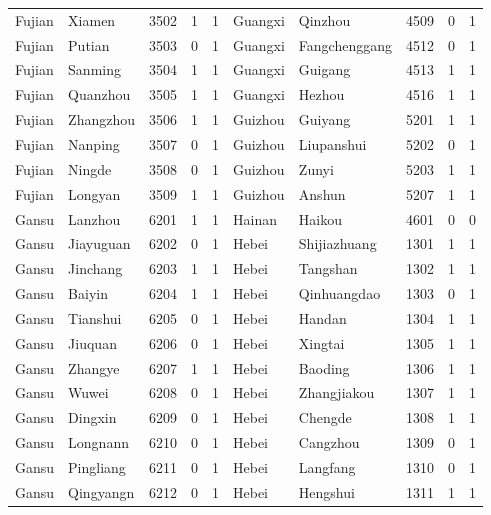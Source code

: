 \documentclass[12pt]{article}
\begin{document}
\begin{table}[!htb]
\begin{adjustbox}{width=\textwidth, totalheight=\baselineskip,keepaspectratio}
\begin{tabular}{llllllllll}
Fujian    & Xiamen    & 3502 & 1   & 1   & Guangxi      & Qinzhou       & 4509 & 0   & 1   \\
Fujian    & Putian    & 3503 & 0   & 1   & Guangxi      & Fangchenggang & 4512 & 0   & 1   \\
Fujian    & Sanming   & 3504 & 1   & 1   & Guangxi      & Guigang       & 4513 & 1   & 1   \\
Fujian    & Quanzhou  & 3505 & 1   & 1   & Guangxi      & Hezhou        & 4516 & 1   & 1   \\
Fujian    & Zhangzhou & 3506 & 1   & 1   & Guizhou      & Guiyang       & 5201 & 1   & 1   \\
Fujian    & Nanping   & 3507 & 0   & 1   & Guizhou      & Liupanshui    & 5202 & 0   & 1   \\
Fujian    & Ningde    & 3508 & 0   & 1   & Guizhou      & Zunyi         & 5203 & 1   & 1   \\
Fujian    & Longyan   & 3509 & 1   & 1   & Guizhou      & Anshun        & 5207 & 1   & 1   \\
Gansu     & Lanzhou   & 6201 & 1   & 1   & Hainan       & Haikou        & 4601 & 0   & 0   \\
Gansu     & Jiayuguan & 6202 & 0   & 1   & Hebei        & Shijiazhuang  & 1301 & 1   & 1   \\
Gansu     & Jinchang  & 6203 & 1   & 1   & Hebei        & Tangshan      & 1302 & 1   & 1   \\
Gansu     & Baiyin    & 6204 & 1   & 1   & Hebei        & Qinhuangdao   & 1303 & 0   & 1   \\
Gansu     & Tianshui  & 6205 & 0   & 1   & Hebei        & Handan        & 1304 & 1   & 1   \\
Gansu     & Jiuquan   & 6206 & 0   & 1   & Hebei        & Xingtai       & 1305 & 1   & 1   \\
Gansu     & Zhangye   & 6207 & 1   & 1   & Hebei        & Baoding       & 1306 & 1   & 1   \\
Gansu     & Wuwei     & 6208 & 0   & 1   & Hebei        & Zhangjiakou   & 1307 & 1   & 1   \\
Gansu     & Dingxin   & 6209 & 0   & 1   & Hebei        & Chengde       & 1308 & 1   & 1   \\
Gansu     & Longnann  & 6210 & 0   & 1   & Hebei        & Cangzhou      & 1309 & 0   & 1   \\
Gansu     & Pingliang & 6211 & 0   & 1   & Hebei        & Langfang      & 1310 & 0   & 1   \\
Gansu     & Qingyangn & 6212 & 0   & 1   & Hebei        & Hengshui      & 1311 & 1   & 1   \\

\end{tabular}
\end{adjustbox}
\end{table}
\end{document}
